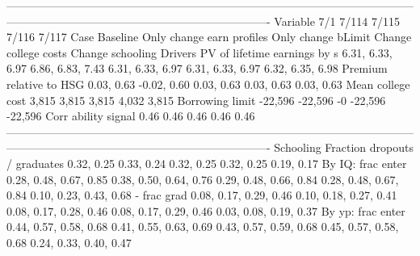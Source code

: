 ----------------------------------------------------------------------------------------------------------------------------------------------------------------------------------
                              Variable                         7/1                          7/114                    7/115                       7/116                       7/117
                                  Case                    Baseline      Only change earn profiles       Only change bLimit        Change college costs            Change schooling
                               Drivers                                                                                                                                            
          PV of lifetime earnings by s            6.31, 6.33, 6.97               6.86, 6.83, 7.43         6.31, 6.33, 6.97            6.31, 6.33, 6.97            6.32, 6.35, 6.98
               Premium relative to HSG                  0.03, 0.63                    -0.02, 0.60               0.03, 0.63                  0.03, 0.63                  0.03, 0.63
                     Mean college cost                       3,815                          3,815                    3,815                       4,032                       3,815
                       Borrowing limit                     -22,596                        -22,596                       -0                     -22,596                     -22,596
                   Corr ability signal                        0.46                           0.46                     0.46                        0.46                        0.46
----------------------------------------------------------------------------------------------------------------------------------------------------------------------------------
                             Schooling                                                                                                                                            
         Fraction dropouts / graduates                  0.32, 0.25                     0.33, 0.24               0.32, 0.25                  0.32, 0.25                  0.19, 0.17
                     By IQ: frac enter      0.28, 0.48, 0.67, 0.85         0.38, 0.50, 0.64, 0.76   0.29, 0.48, 0.66, 0.84      0.28, 0.48, 0.67, 0.84      0.10, 0.23, 0.43, 0.68
                           - frac grad      0.08, 0.17, 0.29, 0.46         0.10, 0.18, 0.27, 0.41   0.08, 0.17, 0.28, 0.46      0.08, 0.17, 0.29, 0.46      0.03, 0.08, 0.19, 0.37
                     By yp: frac enter      0.44, 0.57, 0.58, 0.68         0.41, 0.55, 0.63, 0.69   0.43, 0.57, 0.59, 0.68      0.45, 0.57, 0.58, 0.68      0.24, 0.33, 0.40, 0.47
